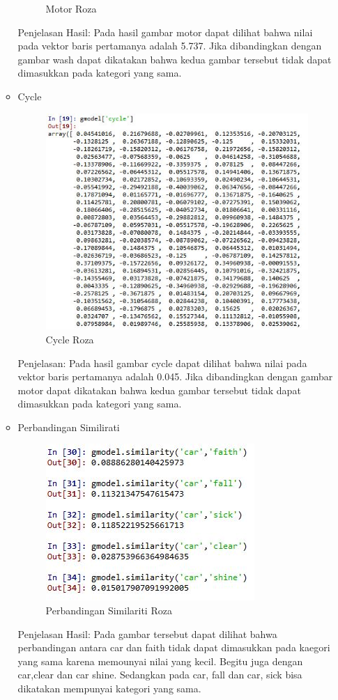 \begin{enumerate}
\begin{itemize}
\begin{figure}[!hbtp]
\caption{Motor Roza}
\label{text-fadila}
\end{figure}
\par Penjelasan Hasil:  Pada hasil gambar motor dapat dilihat bahwa nilai pada vektor baris pertamanya adalah 5.737. Jika dibandingkan dengan gambar wash dapat dikatakan bahwa kedua gambar tersebut tidak dapat dimasukkan pada kategori yang sama.
\item Cycle
\begin{figure}[!hbtp]
\centering
\includegraphics[scale=0.6]{figures/cycleroza.jpg}
\caption{Cycle Roza}
\label{text-fadila}
\end{figure}
\par Penjelasan:  Pada hasil gambar cycle dapat dilihat bahwa nilai pada vektor baris pertamanya adalah 0.045. Jika dibandingkan dengan gambar motor dapat dikatakan bahwa kedua gambar tersebut tidak dapat dimasukkan pada kategori yang sama.


\item Perbandingan Similirati
\begin{figure}[!hbtp]
\centering
\includegraphics[scale=0.6]{figures/perbandinganrozaa.jpg}
\caption{Perbandingan Similariti Roza}
\label{text-fadila}
\end{figure}
\par Penjelasan Hasil: Pada gambar tersebut dapat dilihat bahwa perbandingan antara car dan faith tidak dapat dimasukkan pada kaegori yang sama karena memounyai nilai yang kecil. Begitu juga dengan car,clear dan car shine. Sedangkan pada car, fall dan car, sick bisa dikatakan mempunyai kategori yang sama.


\end{itemize}
\end{enumerate}

